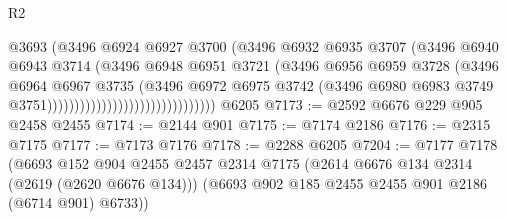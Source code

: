 \begin{lexlean}{R2}
\begin{coremodule}
                                                  @3693
                                                  (@3496
                                                    @6924
                                                    @6927
                                                    @3700
                                                    (@3496
                                                      @6932
                                                      @6935
                                                      @3707
                                                      (@3496
                                                        @6940
                                                        @6943
                                                        @3714
                                                        (@3496
                                                          @6948
                                                          @6951
                                                          @3721
                                                          (@3496
                                                            @6956
                                                            @6959
                                                            @3728
                                                            (@3496
                                                              @6964
                                                              @6967
                                                              @3735
                                                              (@3496
                                                                @6972
                                                                @6975
                                                                @3742
                                                                (@3496
                                                                  @6980
                                                                  @6983
                                                                  @3749
                                                                  @3751)))))))))))))))))))))))))))))))
    @6205
@7173 := @2592 @6676 @229 @905 @2458 @2455
@7174 := @2144 @901
@7175 := @7174 @2186
@7176 := @2315 @7175
@7177 := @7173 @7176
@7178 := @2288 @6205
@7204 := @7177
    @7178
    (@6693
      @152
      @904
      @2455
      @2457
      @2314
      @7175
      (@2614 @6676 @134 @2314 (@2619 (@2620 @6676 @134)))
      (@6693 @902 @185 @2455 @2455 @901 @2186 (@6714 @901) @6733))

\end{coremodule}
\end{lexlean}
